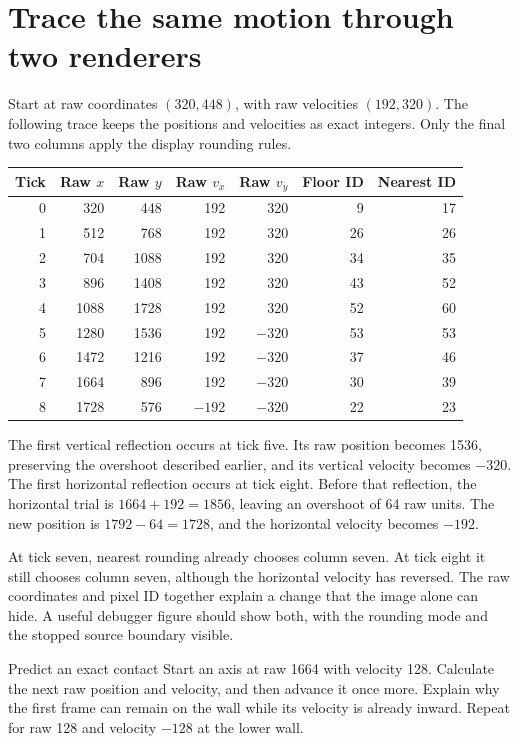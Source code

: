 \section{Trace the same motion through two renderers}
Start at raw coordinates \((320,448)\), with raw velocities \((192,320)\).
The following trace keeps the positions and velocities as exact integers.
Only the final two columns apply the display rounding rules.

\begin{longtable}{rrrrrrr}
  \toprule
  Tick & Raw \(x\) & Raw \(y\) & Raw \(v_x\) & Raw \(v_y\) & Floor ID & Nearest ID \\
  \midrule
  0    & 320       & 448       & 192         & 320         & 9        & 17         \\
  1    & 512       & 768       & 192         & 320         & 26       & 26         \\
  2    & 704       & 1088      & 192         & 320         & 34       & 35         \\
  3    & 896       & 1408      & 192         & 320         & 43       & 52         \\
  4    & 1088      & 1728      & 192         & 320         & 52       & 60         \\
  5    & 1280      & 1536      & 192         & $-320$      & 53       & 53         \\
  6    & 1472      & 1216      & 192         & $-320$      & 37       & 46         \\
  7    & 1664      & 896       & 192         & $-320$      & 30       & 39         \\
  8    & 1728      & 576       & $-192$      & $-320$      & 22       & 23         \\
  \bottomrule
\end{longtable}
The first vertical reflection occurs at tick five. Its raw position becomes
1536, preserving the overshoot described earlier, and its vertical velocity
becomes \(-320\). The first horizontal reflection occurs at tick eight. Before
that reflection, the horizontal trial is \(1664+192=1856\), leaving an overshoot
of 64 raw units. The new position is \(1792-64=1728\), and the horizontal velocity
becomes \(-192\).

At tick seven, nearest rounding already chooses column seven. At tick eight it
still chooses column seven, although the horizontal velocity has reversed. The
raw coordinates and pixel ID together explain a change that the image alone can
hide. A useful debugger figure should show both, with the rounding mode and the
stopped source boundary visible.

\begin{MARSExercise}{Predict an exact contact}
  Start an axis at raw 1664 with velocity 128. Calculate the next raw position and
  velocity, and then advance it once more. Explain why the first frame can remain
  on the wall while its velocity is already inward. Repeat for raw 128 and velocity
  \(-128\) at the lower wall.
\end{MARSExercise}
